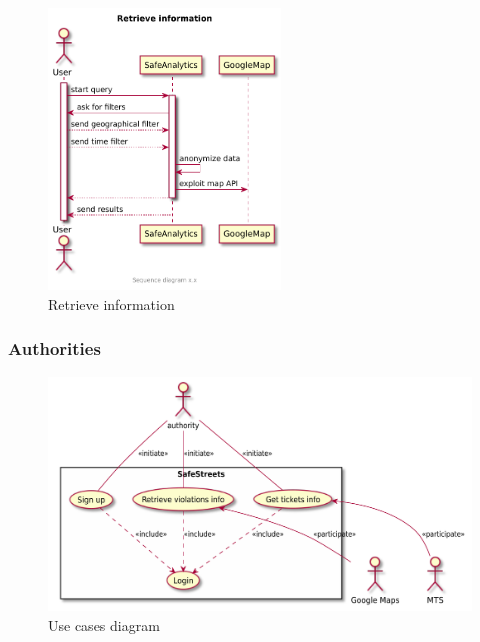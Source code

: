 \documentclass[a4paper]{article}
\begin{document}
\begin{figure}[H]
\centering
\includegraphics[width=0.55\textwidth]{sequence_diagram_retrieve_information}
\caption{Retrieve information}
\end{figure}

\subsubsection{Authorities}

\begin{figure}[H]
\centering
\includegraphics[width=\textwidth]{authorities_usecases}
\caption{Use cases diagram}
\end{figure}
\end{document}
